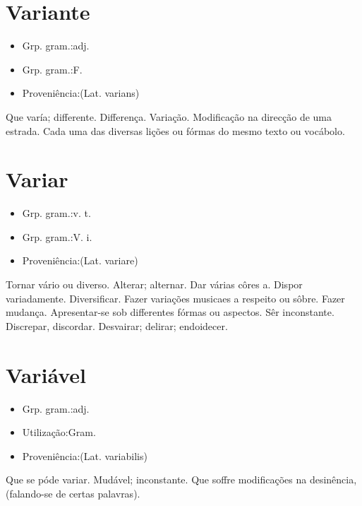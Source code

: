 \documentclass{article}
\begin{document}
\section{Variante}
\begin{itemize}
\item {Grp. gram.:adj.}
\end{itemize}
\begin{itemize}
\item {Grp. gram.:F.}
\end{itemize}
\begin{itemize}
\item {Proveniência:(Lat. \textunderscore varians\textunderscore )}
\end{itemize}
Que varía; differente.
Differença.
Variação.
Modificação na direcção de uma estrada.
Cada uma das diversas lições ou fórmas do mesmo texto ou vocábolo.
\section{Variar}
\begin{itemize}
\item {Grp. gram.:v. t.}
\end{itemize}
\begin{itemize}
\item {Grp. gram.:V. i.}
\end{itemize}
\begin{itemize}
\item {Proveniência:(Lat. \textunderscore variare\textunderscore )}
\end{itemize}
Tornar vário ou diverso.
Alterar; alternar.
Dar várias côres a.
Dispor variadamente.
Diversificar.
Fazer variações musicaes a respeito ou sôbre.
Fazer mudança.
Apresentar-se sob differentes fórmas ou aspectos.
Sêr inconstante.
Discrepar, discordar.
Desvairar; delirar; endoidecer.
\section{Variável}
\begin{itemize}
\item {Grp. gram.:adj.}
\end{itemize}
\begin{itemize}
\item {Utilização:Gram.}
\end{itemize}
\begin{itemize}
\item {Proveniência:(Lat. \textunderscore variabilis\textunderscore )}
\end{itemize}
Que se póde variar.
Mudável; inconstante.
Que soffre modificações na desinência, (falando-se de certas palavras).
\end{document}

